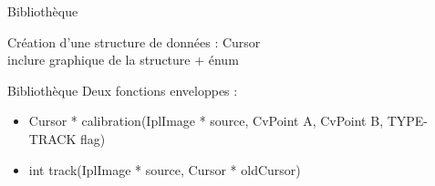 \documentclass{beamer}
\begin{document}
            \begin{frame}{Bibliothèque}

            Création d'une structure de données : Cursor\\
    inclure graphique de la structure + énum
            \end{frame}
            
            \begin{frame}{Bibliothèque}
            Deux fonctions enveloppes : \\
                  \begin{itemize}
                        \item{Cursor * calibration(IplImage * source, CvPoint A, CvPoint B, TYPE-TRACK flag)}
                        \item{int track(IplImage * source, Cursor * oldCursor)}
                  \end{itemize}            
            \end{frame}
\end{document}
